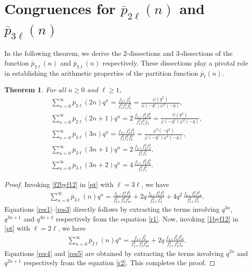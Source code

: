 \documentclass[11pt, reqno]{amsart}
\newtheorem{theorem}{Theorem}[section]
\numberwithin{equation}{section}
\begin{document}
	\section{Congruences for $\overline{p}_{2\ell}(n)$ and $\overline{p}_{3\ell}(n)$}
	In the following theorem, we derive the 2-dissections and 3-dissections of the function $\overline{p}_{2\ell}(n)$ and $\overline{p}_{3\ell}(n)$ respectively. These dissections play a pivotal role in establishing the arithmetic properties of the partition function $\overline{p}_{\ell}(n)$.
	\begin{theorem}\label{t1} For all $n\geq0$ and $\ell\geq1$,
		\begin{align}
			\sum_{n=0}^{\infty}\overline{p}_{2\ell}(2n)q^n=\frac{f_{2\ell}f_4^5}{f_{\ell}^2f_1^4f_{8}^2}=\frac{\varphi(q^2)}{\varphi(-q^\ell)\varphi^2(-q)},\label{res4}\\
			\sum_{n=0}^{\infty}\overline{p}_{2\ell}(2n+1)q^n=2\,\frac{f_{2\ell}f_2^2f_{8}^2}
			{f_{\ell}^2f_1^4f_4} =\frac{\psi(q^4)}{\varphi(-q^\ell)\varphi^2(-q)},\label{res5}\\
			\sum_{n=0}^{\infty}\overline{p}_{3\ell}(3n)q^n=
			\frac{f_{2\ell}f_2^4f_3^6}{f_{\ell}^2f_1^8f_{6}^3}=\frac{\varphi^3(-q^3)}{\varphi(-q^\ell)\varphi^4(-q)},\label{res1}\\
			\sum_{n=0}^{\infty}\overline{p}_{3\ell}(3n+1)q^n=
			2\,\frac{f_{2\ell}f_2^3f_3^3}{f_{\ell}^2f_1^7},\label{res2}\\
			\sum_{n=0}^{\infty}\overline{p}_{3\ell}(3n+2)q^n=
			4\,\frac{f_{2\ell}f_2^2f_{6}^3}{f_{\ell}^2f_1^6}.\label{res3}
		\end{align}
	\end{theorem}
	\begin{proof}
		Invoking \eqref{f2byf12} in \eqref{pt} with $\ell=3\ell$, we have
		\begin{align}\label{r1}
			\sum_{n=0}^{\infty}\overline{p}_{3\ell}(n)q^n=
			\frac{f_{6\ell}f_6^4f_9^6}{f_{3\ell}^2f_3^8f_{18}^3}
			+2q\,\frac{f_{6\ell}f_6^3f_9^3}{f_{3\ell}^2f_3^7}
			+4q^2\,\frac{f_{6\ell}f_6^2f_{18}^3}{f_{3\ell}^2f_3^6}.
		\end{align}
		Equations \eqref{res1}--\eqref{res3} directly follows by extracting the terms involving $q^{3n}$, $q^{3n+1}$ and $q^{3n+2}$ respectively from the equation \eqref{r1}. Now, invoking \eqref{1byf12} in \eqref{pt} with $\ell=2\ell$, we have
		\begin{align}
			\sum_{n=0}^{\infty}\overline{p}_{2\ell}(n)q^n=\frac{f_{4\ell}f_8^5}{f_{2\ell}^2f_2^4f_{16}^2}
			+2q\,\frac{f_{4\ell}f_4^2f_{16}^2}
			{f_{2\ell}^2f_2^4f_8}. \label{r2}
		\end{align}
		Equations \eqref{res4} and \eqref{res5} are obtained  by extracting the terms involving $q^{2n}$ and $q^{2n+1}$ respectively from the equation \eqref{r2}. This completes the proof.
	\end{proof}
\end{document}
